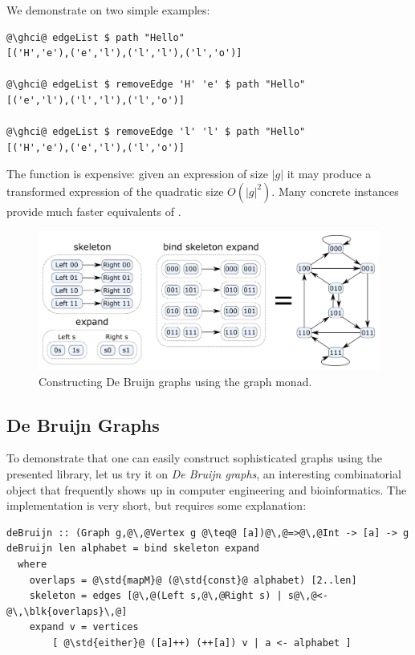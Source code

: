 We demonstrate  on two simple examples:
\begin{verbatim}
@\ghci@ edgeList $ path "Hello"
[('H','e'),('e','l'),('l','l'),('l','o')]

@\ghci@ edgeList $ removeEdge 'H' 'e' $ path "Hello"
[('e','l'),('l','l'),('l','o')]

@\ghci@ edgeList $ removeEdge 'l' 'l' $ path "Hello"
[('H','e'),('e','l'),('l','o')]
\end{verbatim}

\noindent
The  function is expensive: given an expression of size $|g|$
it may produce a transformed expression of the quadratic size $O(|g|^2)$. Many
concrete  instances provide much faster equivalents of .

\begin{figure}
\centerline{\includegraphics[scale=0.3]{fig/De-Bruijn-construction.pdf}}
\vspace{-1mm}
\caption{Constructing De Bruijn graphs using the graph monad.\label{fig-de-bruijn}}
\vspace{-1mm}
\end{figure}

\subsection{De Bruijn Graphs}

To demonstrate that one can easily construct sophisticated graphs using
the presented library, let us try it on \emph{De Bruijn graphs}, an interesting
combinatorial object that frequently shows up in computer engineering and
bioinformatics. The implementation is very short, but requires some explanation:

\begin{verbatim}
deBruijn :: (Graph g,@\,@Vertex g @\teq@ [a])@\,@=>@\,@Int -> [a] -> g
deBruijn len alphabet = bind skeleton expand
  where
    overlaps = @\std{mapM}@ (@\std{const}@ alphabet) [2..len]
    skeleton = edges [@\,@(Left s,@\,@Right s) | s@\,@<-@\,\blk{overlaps}\,@]
    expand v = vertices
        [ @\std{either}@ ([a]++) (++[a]) v | a <- alphabet ]
\end{verbatim}

